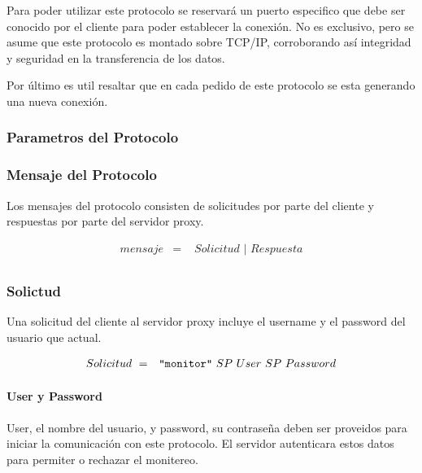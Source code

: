 \documentclass[a4paper,10pt]{article}
\begin{document}
        Para poder utilizar este protocolo se reservar\'a un puerto especifico que debe ser conocido 
        por el cliente para poder establecer la conexi\'on. No es exclusivo, pero se asume que este 
        protocolo es montado sobre TCP/IP, corroborando as\'i integridad y seguridad en la transferencia 
        de los datos.

        Por \'ultimo es util resaltar que en cada pedido de este protocolo se esta generando una nueva 
        conexi\'on.

        \subsubsection{Parametros del Protocolo}

        \subsubsection{Mensaje del Protocolo}
            Los mensajes del protocolo consisten de solicitudes por parte del cliente y respuestas por parte del servidor proxy.

            \begin{eqnarray*}
                mensaje  & = &\,\,Solicitud\,\,|\,\,Respuesta\nonumber\\
            \end{eqnarray*}

        \subsubsection{Solictud}
        Una solicitud del cliente al servidor proxy incluye el username y el password del usuario que actual.

        \begin{eqnarray*}
                Solicitud\ & = & \verb+"monitor"+\,\,SP\,\,User\,\,SP\,\,Password\nonumber\\
        \end{eqnarray*}


        \paragraph*{User y Password}
        User, el nombre del usuario, y password, su contraseña deben ser proveidos para iniciar la comunicaci\'on
        con este protocolo. El servidor autenticara estos datos para permiter o rechazar el monitereo.
            
\end{document}
